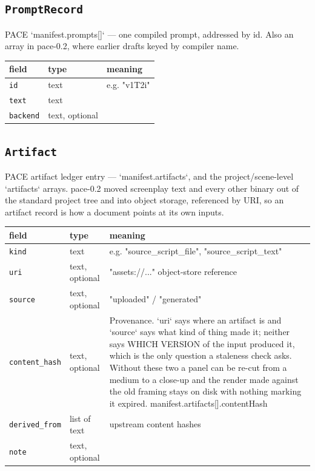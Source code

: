 \subsection*{\texttt{PromptRecord}}
\noindent PACE `manifest.prompts[]` ---\allowbreak{} one compiled prompt, addressed by id. Also an array in pace-0.2, where earlier drafts keyed by compiler name.

\begin{longtable}{@{}R{0.24\textwidth}R{0.21\textwidth}R{0.49\textwidth}@{}}
\toprule \textbf{field} & \textbf{type} & \textbf{meaning} \\ \midrule
\endhead
\texttt{id} & text & e.g. "v1T2i" \\
\texttt{text} & text &  \\
\texttt{backend} & text, optional &  \\
\bottomrule
\end{longtable}

\subsection*{\texttt{Artifact}}
\noindent PACE artifact ledger entry ---\allowbreak{} `manifest.artifacts`, and the project/\allowbreak{}scene-level `artifacts` arrays. pace-0.2 moved screenplay text and every other binary out of the standard project tree and into object storage, referenced by URI, so an artifact record is how a document points at its own inputs.

\begin{longtable}{@{}R{0.24\textwidth}R{0.21\textwidth}R{0.49\textwidth}@{}}
\toprule \textbf{field} & \textbf{type} & \textbf{meaning} \\ \midrule
\endhead
\texttt{kind} & text & e.g. "source\_\allowbreak script\_\allowbreak file", "source\_\allowbreak script\_\allowbreak text" \\
\texttt{uri} & text, optional & "assets:/\allowbreak{}/\allowbreak{}..." object-store reference \\
\texttt{source} & text, optional & "uploaded" /\allowbreak{} "generated" \\
\texttt{content\_\allowbreak hash} & text, optional & Provenance. `uri` says where an artifact is and `source` says what kind of thing made it; neither says WHICH VERSION of the input produced it, which is the only question a staleness check asks. Without these two a panel can be re-cut from a medium to a close-up and the render made against the old framing stays on disk with nothing marking it expired. manifest.artifacts[].contentHash \\
\texttt{derived\_\allowbreak from} & list of text & upstream content hashes \\
\texttt{note} & text, optional &  \\
\bottomrule
\end{longtable}

